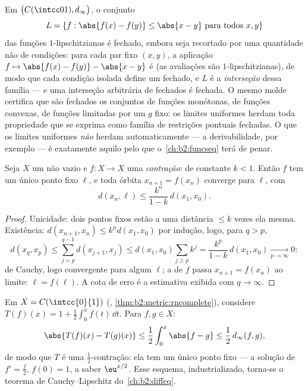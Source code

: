 \begin{example}\label{ex:b2:metric:lipclosed}
Em $\bigl(C(\intcc01), d_\infty\bigr)$, o conjunto
\[
L = \{f : \abs{f(x) - f(y)} \leq \abs{x - y}
\ \text{para todos } x, y\}
\]
das funções $1$-lipschitzianas é fechado, embora seja recortado por
uma quantidade não  de condições: para cada par fixo $(x, y)$, a
aplicação $f \mapsto \abs{f(x) - f(y)} - \abs{x - y}$ é 
(as avaliações são $1$-lipschitzianas), de modo que cada condição isolada
define um fechado, e $L$ é a \emph{interseção} dessa
família --- e uma interseção arbitrária de fechados é
fechada. O mesmo molde certifica que são fechados os conjuntos de funções
monótonas, de funções convexas, de funções limitadas por um $g$ fixo:
os limites uniformes herdam toda propriedade que se exprima como família
de restrições pontuais fechadas. O que os limites uniformes \emph{não}
herdam automaticamente --- a derivabilidade, por exemplo --- é exatamente
aquilo pelo que o~\cref{ch:b2:funcseq} terá de penar.
\end{example}

\begin{theorem}\label{thm:b2:metric:banach}
Seja $X$ um  não vazio e $f \colon X \to X$ uma
\emph{contração}:  de constante $k < 1$. Então $f$ tem um
único ponto fixo $\ell$, e toda órbita $x_{n+1} = f(x_n)$
converge para $\ell$, com
\[
d(x_n, \ell) \leq \frac{k^n}{1 - k}\, d(x_1, x_0) .
\]
\end{theorem}

\begin{proof}
Unicidade: dois pontos fixos estão a uma distância $\leq k$ vezes ela mesma.
Existência: $d(x_{n+1}, x_n) \leq k^n d(x_1, x_0)$ por indução, logo,
para $q > p$,
\[
d(x_q, x_p) \leq \sum_{j=p}^{q-1} d(x_{j+1}, x_j)
\leq d(x_1, x_0) \sum_{j \geq p} k^j
= \frac{k^p}{1-k}\, d(x_1, x_0) \xrightarrow[p\to\infty]{} 0 :
\]
de Cauchy, logo convergente para algum $\ell$; a  de $f$ passa
$x_{n+1} = f(x_n)$ ao limite: $\ell = f(\ell)$. A cota de erro
é a estimativa exibida com $q \to \infty$.
\end{proof}

\begin{example}\label{ex:b2:metric:integralequation}
Em $X = C(\intcc{0}{1})$ (,
\cref{thm:b2:metric:rncomplete}), considere $T(f)(x) = 1 + \frac12
\int_0^x f(t)\,\dd t$. Para $f, g \in X$:
\[
\abs{T(f)(x) - T(g)(x)} \leq \frac12 \int_0^x \abs{f - g} \leq
\frac12\, d_\infty(f, g),
\]
de modo que $T$ é uma $\frac12$-contração: ela tem um único ponto fixo
 --- a solução de $f' = \frac f2$, $f(0) = 1$, a saber
$\eu^{x/2}$. Esse esquema, industrializado, torna-se o
teorema de Cauchy--Lipschitz do~\cref{ch:b2:diffeq}.
\end{example}

